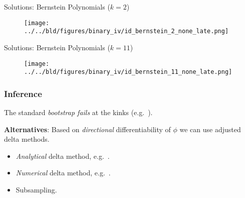 \documentclass[11pt, aspectratio=169]{beamer}
\begin{document}
\begin{frame}{Solutions: Bernstein Polynomials ($k=2$)}

    \begin{figure}
        \centering
        \texttt{[image: ../../bld/figures/binary\_iv/id\_bernstein\_2\_none\_late.png]}
    \end{figure}


\end{frame}

\begin{frame}{Solutions: Bernstein Polynomials ($k=11$)}

    \begin{figure}
        \centering
        \texttt{[image: ../../bld/figures/binary\_iv/id\_bernstein\_11\_none\_late.png]}
    \end{figure}


\end{frame}

\begin{frame}
    \frametitle{Inference}

    The standard \textit{bootstrap fails} at the kinks (e.g.~\citet{fang2019infdirdiff}).

    \vspace{0.5cm}

    \textbf{Alternatives}: Based on \textit{directional} differentiability of $\phi$ we can use adjusted delta methods.
    \begin{itemize}
        \item \textit{Analytical} delta method, e.g.~\cite{fang2019infdirdiff}.
        \item \textit{Numerical} delta method, e.g.~\cite{hong2018numerical}.
        \item Subsampling.
    \end{itemize}

\end{frame}
\end{document}
